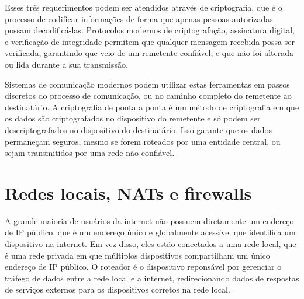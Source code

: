 


Esses três requerimentos podem ser atendidos através de criptografia, que é o processo de codificar informações de forma que apenas pessoas autorizadas possam decodificá-las. Protocolos modernos de criptografação, assinatura digital, e verificação de integridade permitem que qualquer mensagem recebida possa ser verificada, garantindo que veio de um remetente confiável, e que não foi alterada ou lida durante a sua transmissão.

Sistemas de comunicação modernos podem utilizar estas ferramentas em passos discretos do processo de comunicação, ou no caminho completo do remetente ao destinatário. A criptografia de ponta a ponta é um método de criptografia em que os dados são criptografados no dispositivo do remetente e só podem ser descriptografados no dispositivo do destinatário. Isso garante que os dados permaneçam seguros, mesmo se forem roteados por uma entidade central, ou sejam transmitidos por uma rede não confiável.

\section {Redes locais, NATs e firewalls}

A grande maioria de usuários da internet não possuem diretamente um endereço de IP público, que é um endereço único e globalmente acessível que identifica um dispositivo na internet. Em vez disso, eles estão conectados a uma rede local, que é uma rede privada em que múltiplos dispositivos compartilham um único endereço de IP público. O roteador é o dispositivo reponsável por gerenciar o tráfego de dados entre a rede local e a internet, redirecionando dados de respostas de serviços externos para os dispositivos corretos na rede local.

